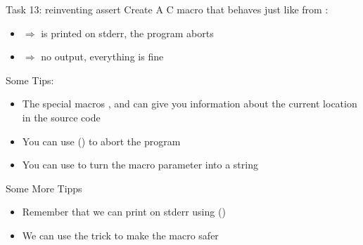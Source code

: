 \documentclass[10pt,graphics,aspectratio=169,table]{beamer}
\begin{document}
\begin{frame}[fragile]{Task 13: reinventing assert}
Create A C macro that behaves just like  from :
\begin{itemize}
    \item  {} $\Rightarrow$ 
        is printed on stderr, the program aborts
    \item {} $\Rightarrow$  no output, everything is fine
\end{itemize}

Some Tips:
\begin{itemize}
    \item The special macros  ,  and 
        can give you information about the current location in the source code
    \item You can use  
        () to abort the program
    \item You can use  to turn the macro parameter into a string
\end{itemize}
    

\end{frame}

\begin{frame}[fragile]{Some More Tipps}
\begin{itemize}
    \item Remember that we can print on stderr using 
          ()
    \item We can use the  trick to make the macro safer
\end{itemize}
\end{frame}
\end{document}
